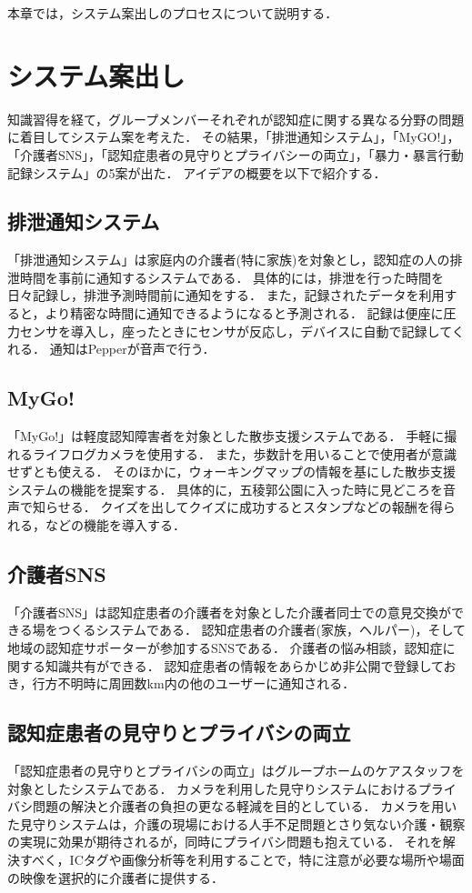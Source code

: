\documentclass[../report]{subfiles}
\begin{document}
本章では，システム案出しのプロセスについて説明する．


\section{システム案出し} \label{sec:4_anndashi}
知識習得を経て，グループメンバーそれぞれが認知症に関する異なる分野の問題に着目してシステム案を考えた．
その結果，「排泄通知システム」，「MyGO!」，「介護者SNS」，「認知症患者の見守りとプライバシーの両立」，「暴力・暴言行動記録システム」の5案が出た．
アイデアの概要を以下で紹介する．

\subsection{排泄通知システム}
「排泄通知システム」は家庭内の介護者(特に家族)を対象とし，認知症の人の排泄時間を事前に通知するシステムである．
具体的には，排泄を行った時間を日々記録し，排泄予測時間前に通知をする．
また，記録されたデータを利用すると，より精密な時間に通知できるようになると予測される．
記録は便座に圧力センサを導入し，座ったときにセンサが反応し，デバイスに自動で記録してくれる．
通知はPepperが音声で行う．

\subsection{MyGo!}
「MyGo!」は軽度認知障害者を対象とした散歩支援システムである．
手軽に撮れるライフログカメラを使用する．
また，歩数計を用いることで使用者が意識せずとも使える．
そのほかに，ウォーキングマップの情報を基にした散歩支援システムの機能を提案する．
具体的に，五稜郭公園に入った時に見どころを音声で知らせる．
クイズを出してクイズに成功するとスタンプなどの報酬を得られる，などの機能を導入する．

\subsection{介護者SNS}
「介護者SNS」は認知症患者の介護者を対象とした介護者同士での意見交換ができる場をつくるシステムである．
認知症患者の介護者(家族，ヘルパー)，そして地域の認知症サポーターが参加するSNSである．
介護者の悩み相談，認知症に関する知識共有ができる．
認知症患者の情報をあらかじめ非公開で登録しておき，行方不明時に周囲数km内の他のユーザーに通知される．

\subsection{認知症患者の見守りとプライバシの両立}
「認知症患者の見守りとプライバシの両立」はグループホームのケアスタッフを対象としたシステムである．
カメラを利用した見守りシステムにおけるプライバシ問題の解決と介護者の負担の更なる軽減を目的としている．
カメラを用いた見守りシステムは，介護の現場における人手不足問題とさり気ない介護・観察の実現に効果が期待されるが，同時にプライバシ問題も抱えている．
それを解決すべく，ICタグや画像分析等を利用することで，特に注意が必要な場所や場面の映像を選択的に介護者に提供する．
\end{document}
